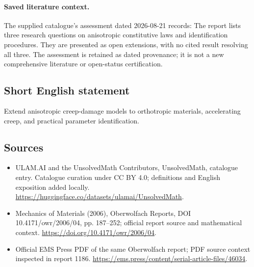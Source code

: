 \documentclass[11pt]{article}
\begin{document}
\paragraph{Saved literature context.} The supplied catalogue's assessment dated 2026-08-21 records: The report lists three research questions on anisotropic constitutive laws and identification procedures. They are presented as open extensions, with no cited result resolving all three. The assessment is retained as dated provenance; it is not a new comprehensive literature or open-status certification.
\subsection{Short English statement}
Extend anisotropic creep-damage models to orthotropic materials, accelerating creep, and practical parameter identification.
\subsection{Sources}
\begin{itemize}
\item[\hypertarget{source:statement:1}{S1}] ULAM.AI and the UnsolvedMath Contributors, UnsolvedMath, catalogue entry. Catalogue curation under CC BY 4.0; definitions and English exposition added locally.
\url{https://huggingface.co/datasets/ulamai/UnsolvedMath}.
\item[\hypertarget{source:statement:2}{S2}] Mechanics of Materials (2006), Oberwolfach Reports, DOI 10.4171/owr/2006/04, pp. 187--252; official report source and mathematical context.
\url{https://doi.org/10.4171/owr/2006/04}.
\item[\hypertarget{source:statement:3}{S3}] Official EMS Press PDF of the same Oberwolfach report; PDF source context inspected in report 1186.
\url{https://ems.press/content/serial-article-files/46034}.
\end{itemize}
\label{end:statement}
\end{document}
